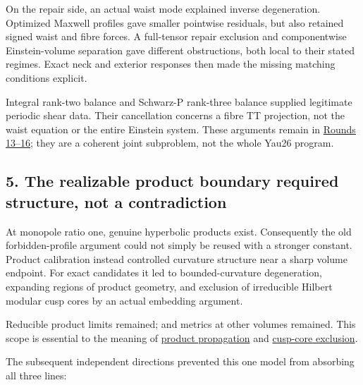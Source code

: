 \documentclass[
  10pt,
]{article}
\begin{document}
On the repair side, an actual waist mode explained inverse degeneration.
Optimized Maxwell profiles gave smaller pointwise residuals, but also
retained signed waist and fibre forces. A full-tensor repair exclusion
and componentwise Einstein-volume separation gave different
obstructions, both local to their stated regimes. Exact neck and
exterior responses then made the missing matching conditions explicit.

Integral rank-two balance and Schwarz-P rank-three balance supplied
legitimate periodic shear data. Their cancellation concerns a fibre TT
projection, not the waist equation or the entire Einstein system. These
arguments remain in \href{../mathematics/current/round16.md}{Rounds
13--16}; they are a coherent joint subproblem, not the whole Yau26
program.

\hypertarget{the-realizable-product-boundary-required-structure-not-a-contradiction}{%
\subsection{5. The realizable product boundary required structure, not a
contradiction}\label{the-realizable-product-boundary-required-structure-not-a-contradiction}}

At monopole ratio one, genuine hyperbolic products exist. Consequently
the old forbidden-profile argument could not simply be reused with a
stronger constant. Product calibration instead controlled curvature
structure near a sharp volume endpoint. For exact candidates it led to
bounded-curvature degeneration, expanding regions of product geometry,
and exclusion of irreducible Hilbert modular cusp cores by an actual
embedding argument.

Reducible product limits remained; and metrics at other volumes
remained. This scope is essential to the meaning of
\href{../mathematics/current/round16_rigidity.md}{product propagation}
and \href{../mathematics/current/round16_global.md}{cusp-core
exclusion}.

The subsequent independent directions prevented this one model from
absorbing all three lines:
\end{document}
